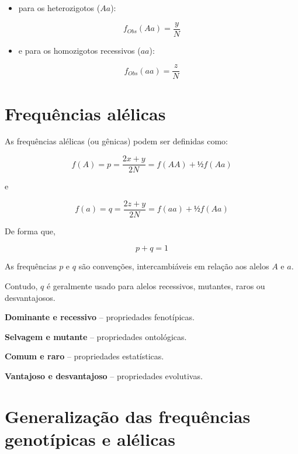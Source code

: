 \documentclass[
]{book}
\providecommand{\tightlist}{%
  \setlength{\itemsep}{0pt}\setlength{\parskip}{0pt}}
\begin{document}
\begin{itemize}
\tightlist
\item
  para os heterozigotos (\(Aa\)):
\end{itemize}

\[f_{Obs}(Aa) = \frac{y}{N}\]

\begin{itemize}
\tightlist
\item
  e para os homozigotos recessivos (\(aa\)):
\end{itemize}

\[f_{Obs}(aa) = \frac{z}{N}\]

\hypertarget{frequuxeancias-aluxe9licas}{%
\section{Frequências alélicas}\label{frequuxeancias-aluxe9licas}}

As frequências alélicas (ou gênicas) podem ser definidas como:

\begin{equation} 
f(A) = p = \frac{2x + y}{2N} = f(AA) + ½f(Aa)
  \label{eq:freqp}
\end{equation}

e

\begin{equation} 
f(a) = q = \frac{2z + y}{2N} = f(aa) + ½f(Aa)
  \label{eq:freqq}
\end{equation}

De forma que,

\begin{equation} 
p + q = 1
  \label{eq:poolgene}
\end{equation}

As frequências \(p\) e \(q\) são convenções, intercambiáveis em relação aos alelos \(A\) e \(a\).

Contudo, \(q\) é geralmente usado para alelos recessivos, mutantes, raros ou desvantajosos.

\textbf{Dominante e recessivo} -- propriedades fenotípicas.

\textbf{Selvagem e mutante} -- propriedades ontológicas.

\textbf{Comum e raro} -- propriedades estatísticas.

\textbf{Vantajoso e desvantajoso} -- propriedades evolutivas.

\linebreak

\hypertarget{generalizauxe7uxe3o-das-frequuxeancias-genotuxedpicas-e-aluxe9licas}{%
\section{Generalização das frequências genotípicas e alélicas}\label{generalizauxe7uxe3o-das-frequuxeancias-genotuxedpicas-e-aluxe9licas}}
\end{document}
